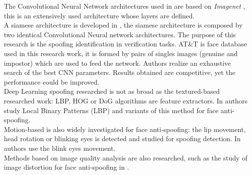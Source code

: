 The Convolutional Neural Network architectures used in \cite{yangLL14,LSTM-CNN} are based on \textit{Imagenet} \cite{imagenet}, this is an extensively used architecture whose layers are defined.\\

A siamese architecture is developed in \cite{Verification}, the siamese architecture is composed by two identical Convolutional Neural network architectures. The purpose of this research is the spoofing identification in verification tasks. AT\&T is face database used in this research work, it is formed by pairs of singles images (genuine and impostor) which are used to feed the network.  Authors realize an exhaustive search of the best CNN parameters. Results obtained are competitive, yet the performance could be improved.\\

Deep Learning spoofing researched is not as broad as the textured-based researched work: LBP, HOG or DoG algorithms are feature extractors. In \cite{LBP_FaceAnti} authors study Local Binary Patterns (LBP) and variants of this method for face anti-spoofing.\\

Motion-based is also widely investigated for face anti-spoofing: the lip movement, head rotation or blinking eyes is detected and studied for spoofing detection. In \cite{Blink_antispoofing} authors use the blink eyes movement.\\

Methods based on image quality analysis are also researched, such as the study of image distortion for face anti-spoofing in \cite{MSUdatabse}.






